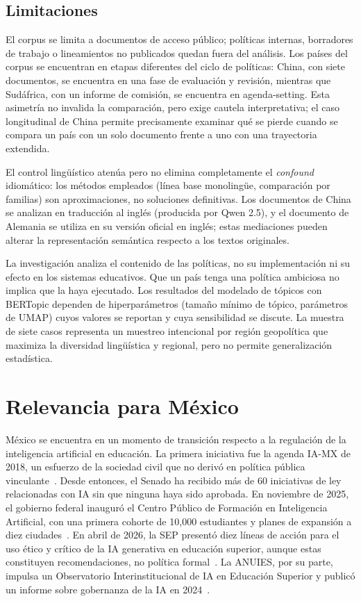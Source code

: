 \subsection{Limitaciones}
\label{subsec:limitaciones}

El corpus se limita a documentos de acceso público; políticas internas, borradores de trabajo o lineamientos no publicados quedan fuera del análisis. Los países del corpus se encuentran en etapas diferentes del ciclo de políticas: China, con siete documentos, se encuentra en una fase de evaluación y revisión, mientras que Sudáfrica, con un informe de comisión, se encuentra en agenda-setting. Esta asimetría no invalida la comparación, pero exige cautela interpretativa; el caso longitudinal de China permite precisamente examinar qué se pierde cuando se compara un país con un solo documento frente a uno con una trayectoria extendida.

El control lingüístico atenúa pero no elimina completamente el \textit{confound} idiomático: los métodos empleados (línea base monolingüe, comparación por familias) son aproximaciones, no soluciones definitivas. Los documentos de China se analizan en traducción al inglés (producida por Qwen 2.5), y el documento de Alemania se utiliza en su versión oficial en inglés; estas mediaciones pueden alterar la representación semántica respecto a los textos originales.

La investigación analiza el contenido de las políticas, no su implementación ni su efecto en los sistemas educativos. Que un país tenga una política ambiciosa no implica que la haya ejecutado. Los resultados del modelado de tópicos con BERTopic dependen de hiperparámetros (tamaño mínimo de tópico, parámetros de UMAP) cuyos valores se reportan y cuya sensibilidad se discute. La muestra de siete casos representa un muestreo intencional por región geopolítica que maximiza la diversidad lingüística y regional, pero no permite generalización estadística.


\section{Relevancia para México}
\label{sec:mexico}

México se encuentra en un momento de transición respecto a la regulación de la inteligencia artificial en educación. La primera iniciativa fue la agenda IA-MX de 2018, un esfuerzo de la sociedad civil que no derivó en política pública vinculante~\citep{cminds2018iamexico}. Desde entonces, el Senado ha recibido más de 60 iniciativas de ley relacionadas con IA sin que ninguna haya sido aprobada. En noviembre de 2025, el gobierno federal inauguró el Centro Público de Formación en Inteligencia Artificial, con una primera cohorte de 10{,}000 estudiantes y planes de expansión a diez ciudades~\citep{mexia2025centro}. En abril de 2026, la SEP presentó diez líneas de acción para el uso ético y crítico de la IA generativa en educación superior, aunque estas constituyen recomendaciones, no política formal~\citep{sep2026ia}. La ANUIES, por su parte, impulsa un Observatorio Interinstitucional de IA en Educación Superior y publicó un informe sobre gobernanza de la IA en 2024~\citep{anuies2024gobernanza}.

